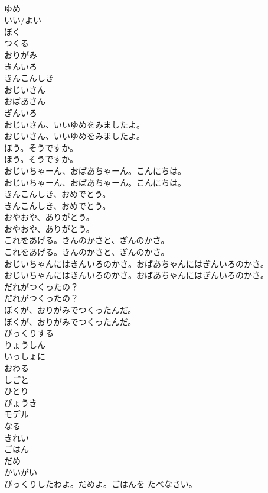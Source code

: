 \documentclass[8pt]{extreport}
\begin{document}
\begin{CJK}{UTF8}{min}
\\	ゆめ
\\	いい/よい
\\	ぼく
\\	つくる
\\	おりがみ
\\	きんいろ
\\	きんこんしき
\\	おじいさん
\\	おばあさん
\\	ぎんいろ
\\	おじいさん、いいゆめをみましたよ。
\\	おじいさん、いいゆめをみましたよ。
\\	ほう。そうですか。
\\	ほう。そうですか。
\\	おじいちゃーん、おばあちゃーん。こんにちは。
\\	おじいちゃーん、おばあちゃーん。こんにちは。
\\	きんこんしき、おめでとう。
\\	きんこんしき、おめでとう。
\\	おやおや、ありがとう。
\\	おやおや、ありがとう。
\\	これをあげる。きんのかさと、ぎんのかさ。
\\	これをあげる。きんのかさと、ぎんのかさ。
\\	おじいちゃんにはきんいろのかさ。おばあちゃんにはぎんいろのかさ。
\\	おじいちゃんにはきんいろのかさ。おばあちゃんにはぎんいろのかさ。
\\	だれがつくったの？
\\	だれがつくったの？
\\	ぼくが、おりがみでつくったんだ。
\\	ぼくが、おりがみでつくったんだ。
\\	びっくりする
\\	りょうしん
\\	いっしょに
\\	おわる
\\	しごと
\\	ひとり
\\	びょうき
\\	モデル
\\	なる
\\	きれい
\\	ごはん
\\	だめ
\\	かいがい
\\	びっくりしたわよ。だめよ。ごはんを たべなさい。

\end{CJK}
\end{document}

